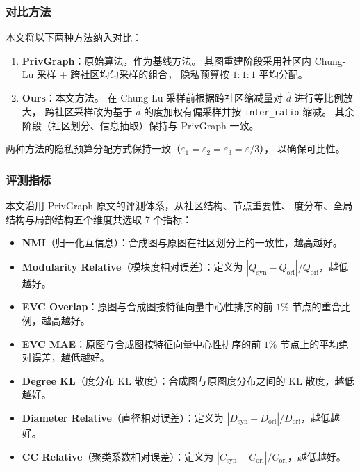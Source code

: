 \subsubsection{对比方法}

\par 本文将以下两种方法纳入对比：

\begin{enumerate}
    \item \textbf{PrivGraph}：原始算法，作为基线方法。
    其图重建阶段采用社区内 Chung-Lu 采样 + 跨社区均匀采样的组合，
    隐私预算按 $1{:}1{:}1$ 平均分配。
    
    \item \textbf{Ours}：本文方法。
    在 Chung-Lu 采样前根据跨社区缩减量对 $\hat{d}$ 进行等比例放大，
    跨社区采样改为基于 $\hat{d}$ 的度加权有偏采样并按 \texttt{inter\_ratio} 缩减。
    其余阶段（社区划分、信息抽取）保持与 PrivGraph 一致。
\end{enumerate}

\par 两种方法的隐私预算分配方式保持一致（$\varepsilon_1 = \varepsilon_2 = \varepsilon_3 = \varepsilon/3$），
以确保可比性。

\subsubsection{评测指标}

\par 本文沿用 PrivGraph 原文的评测体系，从社区结构、节点重要性、
度分布、全局结构与局部结构五个维度共选取 7 个指标：

\begin{itemize}
    \item \textbf{NMI}（归一化互信息）：合成图与原图在社区划分上的一致性，越高越好。
    \item \textbf{Modularity Relative}（模块度相对误差）：定义为 $|Q_{\mathrm{syn}} - Q_{\mathrm{ori}}| / Q_{\mathrm{ori}}$，越低越好。
    \item \textbf{EVC Overlap}：原图与合成图按特征向量中心性排序的前 $1\%$ 节点的重合比例，越高越好。
    \item \textbf{EVC MAE}：原图与合成图按特征向量中心性排序的前 $1\%$ 节点上的平均绝对误差，越低越好。
    \item \textbf{Degree KL}（度分布 KL 散度）：合成图与原图度分布之间的 KL 散度，越低越好。
    \item \textbf{Diameter Relative}（直径相对误差）：定义为 $|D_{\mathrm{syn}} - D_{\mathrm{ori}}| / D_{\mathrm{ori}}$，越低越好。
    \item \textbf{CC Relative}（聚类系数相对误差）：定义为 $|C_{\mathrm{syn}} - C_{\mathrm{ori}}| / C_{\mathrm{ori}}$，越低越好。
\end{itemize}

